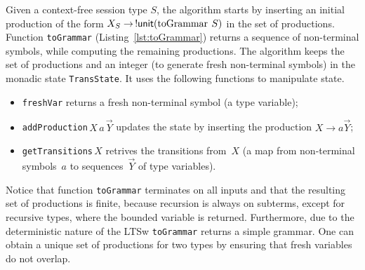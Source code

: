 Given a context-free session type $S$, the algorithm starts by
inserting an initial production of the form
$X_S \rightarrow \,\initialProd(\toGrammarf\,S)$ in the set of
productions.
%
Function \lstinline|toGrammar| (Listing~\ref{lst:toGrammar}) returns a
sequence of non-terminal symbols, while computing the remaining
productions.
%
The algorithm keeps the set of productions and an integer (to generate
fresh non-terminal symbols) in the monadic state
\lstinline{TransState}. It uses the following functions to manipulate
state.
%
\begin{itemize}
\item \lstinline{freshVar} returns a fresh non-terminal symbol (a type
  variable);
\item \lstinline{addProduction}$\,X\,a\,\vec Y$ updates the state by inserting
  the production $X\rightarrow a\vec Y$;
\item \lstinline|getTransitions|$\,X$ retrives the transitions
  from~$X$ (a map from non-terminal symbols~$a$ to sequences~$\vec Y$
  of type variables).
\end{itemize}





Notice that function \lstinline|toGrammar| terminates on all inputs and
that the resulting set of productions is finite, because recursion is
always on subterms, except for recursive types, where the bounded variable
is returned.
%
Furthermore, due to the deterministic nature of the LTSw
\lstinline|toGrammar| returns a simple grammar.
%
%
One can obtain a unique set of productions for two types by
ensuring that fresh variables do not overlap.

